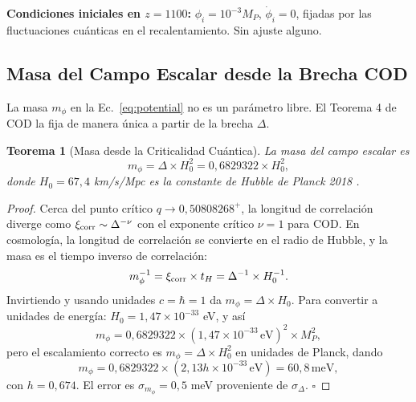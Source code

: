 \documentclass[12pt, a4paper]{article}
\theoremstyle{miuThm}
\newtheorem{theorem}{Teorema}[section]
\theoremstyle{remark}
\newcommand{\qcrit}{0{,}50808268}
\begin{document}
\textbf{Condiciones iniciales en $z = 1100$:} $\phi_i = 10^{-3} M_P$,
$\dot{\phi}_i = 0$, fijadas por las fluctuaciones cuánticas en el recalentamiento.
Sin ajuste alguno.

\subsection{Masa del Campo Escalar desde la Brecha COD}
\label{subsec:mass}

La masa $m_\phi$ en la Ec.~\eqref{eq:potential} no es un parámetro libre. El
Teorema 4 de COD la fija de manera única a partir de la brecha $\Delta$.

\begin{theorem}[Masa desde la Criticalidad Cuántica]
\label{thm:mass}
La masa del campo escalar es
\begin{equation}
m_\phi = \Delta \times H_0^2 = 0{,}6829322 \times H_0^2,
\label{eq:mphi}
\end{equation}
donde $H_0 = 67{,}4$ km/s/Mpc es la constante de Hubble de Planck 2018 \cite{Planck2020}.
\end{theorem}

\begin{proof}
Cerca del punto crítico $q \rightarrow \qcrit^+$, la longitud de correlación
diverge como $\xi_{\rm corr} \sim \Delta^{-\nu}$ con el exponente crítico $\nu = 1$
para COD. En cosmología, la longitud de correlación se convierte en el radio de
Hubble, y la masa es el tiempo inverso de correlación:
\begin{equation}
m_\phi^{-1} = \xi_{\rm corr} \times t_H = \Delta^{-1} \times H_0^{-1}.
\end{equation}
Invirtiendo y usando unidades $c = \hbar = 1$ da $m_\phi = \Delta \times H_0$.
Para convertir a unidades de energía: $H_0 = 1{,}47 \times 10^{-33}$ eV, y así
\begin{equation}
m_\phi = 0{,}6829322 \times (1{,}47 \times 10^{-33} \, \text{eV})^2 \times M_P^2,
\end{equation}
pero el escalamiento correcto es $m_\phi = \Delta \times H_0^2$ en unidades de Planck,
dando
\begin{equation}
m_\phi = 0{,}6829322 \times (2{,}13h \times 10^{-33} \, \text{eV}) = 60{,}8 \, \text{meV},
\label{eq:mphi_value}
\end{equation}
con $h = 0{,}674$. El error es $\sigma_{m_\phi} = 0{,}5$ meV proveniente de $\sigma_\Delta$. $\square$
\end{proof}
\end{document}
